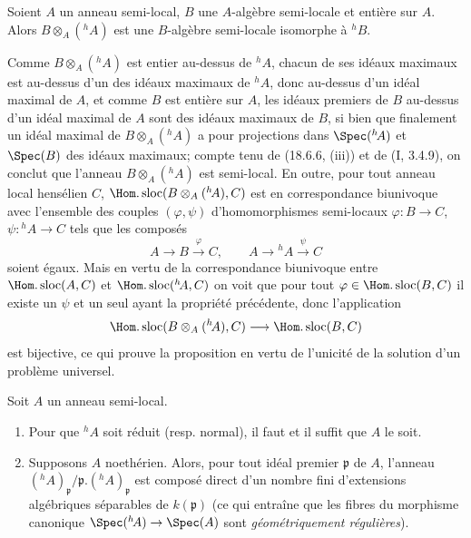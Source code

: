 \begin{proposition}[18.6.8]
\label{IV.18.6.8}
Soient $A$ un anneau semi-local, $B$ une $A$-algèbre semi-locale et entière sur $A$. Alors $B\otimes_A({}^h\!A)$ est une $B$-algèbre semi-locale isomorphe à ${}^h\!B$.
\end{proposition}

Comme $B\otimes_A({}^h\!A)$ est entier au-dessus de ${}^h\!A$, chacun de ses idéaux maximaux est au-dessus d'un des idéaux maximaux de ${}^h\!A$, donc au-dessus d'un idéal maximal de $A$, et comme $B$ est entière sur $A$, les idéaux premiers de $B$ au-dessus d'un idéal maximal de $A$ sont des idéaux maximaux de $B$, si bien que finalement un idéal maximal de $B\otimes_A({}^h\!A)$ a pour projections dans $\Spec({}^h\!A)$ et $\Spec(B)$ des idéaux maximaux; compte tenu de (18.6.6, (iii)) et de (I, 3.4.9), on conclut que l'anneau $B\otimes_A({}^h\!A)$ est semi-local. En outre, pour tout anneau local hensélien $C$, $\Hom.\operatorname{sloc}(B\otimes_A({}^h\!A),C)$ est en correspondance biunivoque avec l'ensemble des couples $(\varphi,\psi)$ d'homomorphismes semi-locaux $\varphi:B\to C$, $\psi:{}^h\!A\to C$ tels que les composés
\[
  A\longrightarrow B\xrightarrow{\varphi}C,\qquad
  A\longrightarrow{}^h\!A\xrightarrow{\psi}C
\]
soient égaux. Mais en vertu de la correspondance biunivoque entre $\Hom.\operatorname{sloc}(A,C)$ et $\Hom.\operatorname{sloc}({}^h\!A,C)$ on voit que pour tout $\varphi\in\Hom.\operatorname{sloc}(B,C)$ il existe un $\psi$ et un seul ayant la propriété précédente, donc l'application
\[
  \Hom.\operatorname{sloc}(B\otimes_A({}^h\!A),C)\longrightarrow\Hom.\operatorname{sloc}(B,C)
\]
est bijective, ce qui prouve la proposition en vertu de l'unicité de la solution d'un problème universel.

\begin{theorem}[18.6.9]
\label{IV.18.6.9}
Soit $A$ un anneau semi-local.
\begin{enumerate}
  \item[(i)] Pour que ${}^h\!A$ soit réduit (resp. normal), il faut et il suffit que $A$ le soit.
  \item[(ii)] Supposons $A$ noethérien. Alors, pour tout idéal premier $\mathfrak p$ de $A$, l'anneau $({}^h\!A)_{\mathfrak p}/\mathfrak p.({}^h\!A)_{\mathfrak p}$ est composé direct d'un nombre fini d'extensions algébriques séparables de $k(\mathfrak p)$ (ce qui entraîne que les fibres du morphisme canonique $\Spec({}^h\!A)\to\Spec(A)$ sont \emph{géométriquement régulières}).
\end{enumerate}
\end{theorem}

